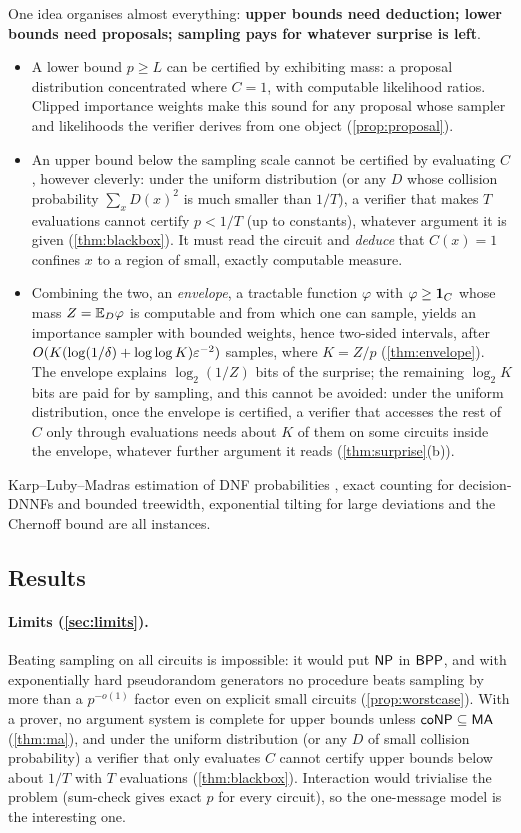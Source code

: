 One idea organises almost everything: \textbf{upper bounds need deduction;
lower bounds need proposals; sampling pays for whatever surprise is left}.
\begin{itemize}
\item A lower bound $p\ge L$ can be certified by exhibiting mass: a proposal
distribution concentrated where $C=1$, with computable likelihood ratios.
Clipped importance weights make this sound for any proposal whose sampler and
likelihoods the verifier derives from one object (\cref{prop:proposal}).
\item An upper bound below the sampling scale cannot be certified by
evaluating $C$, however cleverly: under the uniform distribution (or any $D$ whose
collision probability $\sum_xD(x)^2$ is much smaller than $1/T$), a verifier that
makes $T$ evaluations cannot certify $p<1/T$ (up to constants), whatever argument it
is given (\cref{thm:blackbox}). It must read the circuit and \emph{deduce}
that $C(x)=1$ confines $x$ to a region of small, exactly computable measure.
\item Combining the two, an \emph{envelope}, a tractable function $\varphi$ with
$\varphi\ge\mathbf{1}_C$ whose mass $Z=\mathbb{E}_D\varphi$ is computable and from which one can
sample, yields an importance sampler with bounded weights, hence two-sided
intervals, after $O(K(\log(1/\delta)+\log\log K)\varepsilon^{-2})$ samples, where $K=Z/p$
(\cref{thm:envelope}). The envelope explains $\log_2(1/Z)$ bits of the
surprise; the remaining $\log_2K$ bits are paid for by sampling, and this cannot be
avoided: under the uniform distribution, once the envelope is certified, a verifier
that accesses the rest of $C$ only through evaluations needs about $K$ of them on some
circuits inside the envelope, whatever further argument it reads (\cref{thm:surprise}(b)).
\end{itemize}
Karp--Luby--Madras estimation of DNF probabilities \cite{klm1989}, exact
counting for decision-DNNFs and bounded treewidth, exponential tilting for
large deviations \cite{siegmund1976} and the Chernoff bound are all instances.

\subsection{Results}

\paragraph{Limits (\cref{sec:limits}).} Beating sampling on all circuits is
impossible: it would put $\mathsf{NP}$ in $\mathsf{BPP}$, and with exponentially hard
pseudorandom generators no procedure beats sampling by more than a $p^{-o(1)}$
factor even on explicit small circuits (\cref{prop:worstcase}). With a prover, no
argument system is complete for upper bounds unless $\mathsf{coNP}\subseteq\mathsf{MA}$
(\cref{thm:ma}), and under the uniform distribution (or any $D$ of small collision
probability) a verifier that only evaluates $C$ cannot certify upper bounds below
about $1/T$ with $T$ evaluations (\cref{thm:blackbox}). Interaction would trivialise the problem (sum-check
gives exact $p$ for every circuit), so the one-message model is the
interesting one.

